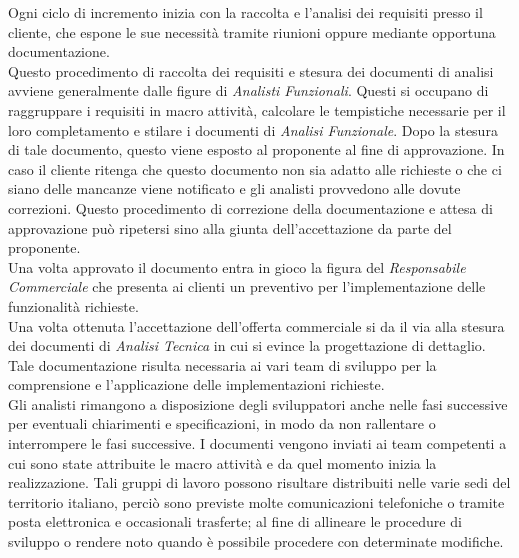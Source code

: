 	Ogni ciclo di incremento inizia con la raccolta e l'analisi dei requisiti presso il cliente, che espone le sue necessità tramite riunioni oppure mediante opportuna documentazione.\\
	
	Questo procedimento di raccolta dei requisiti e stesura dei documenti di analisi avviene generalmente dalle figure di \textit{Analisti Funzionali}. Questi si occupano di raggruppare i requisiti in macro attività, calcolare le tempistiche necessarie per il loro completamento e stilare i documenti di \textit{Analisi Funzionale}. Dopo la stesura di tale documento, questo viene esposto al proponente al fine di approvazione. In caso il cliente ritenga che questo documento non sia adatto alle richieste o che ci siano delle mancanze viene notificato e gli analisti provvedono alle dovute correzioni. Questo procedimento di correzione della documentazione e attesa di approvazione può ripetersi sino alla giunta dell'accettazione da parte del proponente.\\
	
	Una volta approvato il documento entra in gioco la figura del \textit{Responsabile Commerciale} che presenta ai clienti un preventivo per l'implementazione delle funzionalità richieste.\\ %
	
	Una volta ottenuta l'accettazione dell'offerta commerciale si da il via alla stesura dei documenti di \textit{Analisi Tecnica} in cui si evince la progettazione di dettaglio. Tale documentazione risulta necessaria ai vari team di sviluppo per la comprensione e l'applicazione delle implementazioni richieste.\\
	
	Gli analisti rimangono a disposizione degli sviluppatori anche nelle fasi successive per eventuali chiarimenti e specificazioni, in modo da non rallentare o interrompere le fasi successive. I documenti vengono inviati ai team competenti a cui sono state attribuite le macro attività e da quel momento inizia la realizzazione. Tali gruppi di lavoro possono risultare distribuiti nelle varie sedi del territorio italiano, perciò sono previste molte comunicazioni telefoniche o tramite posta elettronica e occasionali trasferte; al fine di allineare le procedure di sviluppo o rendere noto quando è possibile procedere con determinate modifiche. \\
	

